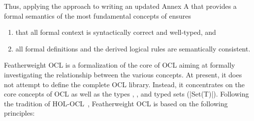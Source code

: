 \isatagannexa
Thus, applying the  \FOCL approach to writing an updated
Annex A that provides a formal semantics of the most fundamental
concepts of \OCL ensures
\begin{enumerate}
\item that all formal context is syntactically correct and well-typed,
  and
\item all formal definitions and the derived logical rules are
  semantically consistent.
\end{enumerate}
\endisatagannexa
\isatagafp
Featherweight OCL is a formalization of the core of OCL
aiming at formally investigating the relationship between the
various concepts. At present, it does not attempt to define the complete
OCL library. Instead, it concentrates on the core concepts of
OCL as well as the types ,
, and typed sets (\inlineocl|Set(T)|).  Following
the tradition of
HOL-OCL~\cite{brucker.ea:hol-ocl:2008,brucker.ea:hol-ocl-book:2006},
Featherweight OCL is based on the following principles:
